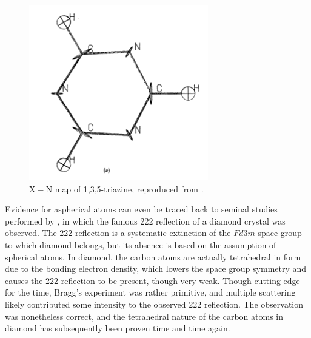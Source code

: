 \begin{refsection}
\begin{figure}
    \centering
    \includegraphics[width=0.5\linewidth]{Figures/x-n-coppens.png}
    \caption[Structure of 1,3,5-triazine.]{$\mathrm{X}-\mathrm{N}$ map of 1,3,5-triazine, reproduced from \citeauthor{Coppens1968EvidenceEffects}.\autocite{Coppens1968EvidenceEffects}}
    \label{fig:x-n-coppens}
\end{figure}

Evidence for aspherical atoms can even be traced back to seminal studies performed by \citeauthor{Bragg1920}, in which the famous 222 reflection of a diamond crystal was observed.
The 222 reflection is a systematic extinction of the $Fd\bar{3}m$ space group to which diamond belongs, but its absence is based on the assumption of spherical atoms.
In diamond, the carbon atoms are actually tetrahedral in form due to the bonding electron density, which lowers the space group symmetry and causes the 222 reflection to be present, though very weak.\autocite{Bragg1920}
Though cutting edge for the time, Bragg's experiment was rather primitive, and multiple scattering likely contributed some intensity to the observed 222 reflection.
The observation was nonetheless correct, and the tetrahedral nature of the carbon atoms in diamond has subsequently been proven time and time again.


\end{refsection}
